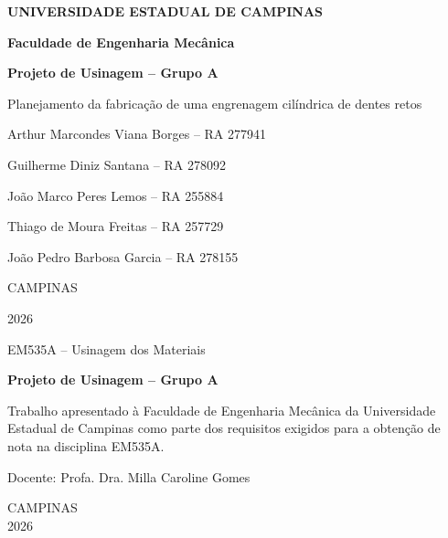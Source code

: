 \documentclass[12pt,a4paper,oneside]{report}
\newcommand{\grupo}{Grupo A}
\newcommand{\autorA}{Arthur Marcondes Viana Borges -- RA 277941}
\newcommand{\autorB}{Guilherme Diniz Santana -- RA 278092}
\newcommand{\autorC}{João Marco Peres Lemos -- RA 255884}
\newcommand{\autorD}{Thiago de Moura Freitas -- RA 257729}
\newcommand{\autorE}{João Pedro Barbosa Garcia -- RA 278155}
\begin{document}

\begin{titlepage}
\centering
{\large\bfseries UNIVERSIDADE ESTADUAL DE CAMPINAS\par}
\vspace{4pt}
{\bfseries Faculdade de Engenharia Mecânica\par}
\vfill
{\LARGE\bfseries Projeto de Usinagem -- \grupo\par}
\vspace{12pt}
Planejamento da fabricação de uma engrenagem cilíndrica de dentes retos\par
\vfill
\autorA\par \autorB\par \autorC\par \autorD\par \autorE\par
\vfill
CAMPINAS\par 2026\par
\end{titlepage}

\thispagestyle{empty}
\begin{center}
EM535A -- Usinagem dos Materiais\par
\vspace*{\fill}
{\Large\bfseries Projeto de Usinagem -- \grupo\par}
\vspace*{\fill}
\end{center}
\hfill\begin{minipage}{0.5\textwidth}
\singlespacing\small
Trabalho apresentado à Faculdade de Engenharia Mecânica da Universidade Estadual de Campinas como parte dos
requisitos exigidos para a obtenção de nota na disciplina EM535A.
\end{minipage}
\vspace*{\fill}

\noindent Docente: Profa. Dra. Milla Caroline Gomes
\vspace*{\fill}
\begin{center}CAMPINAS\\2026\end{center}
\newpage

\pagestyle{empty}
{\singlespacing
\listoffigures\thispagestyle{empty}\clearpage
\listofquadros\thispagestyle{empty}\clearpage
\listoftables\thispagestyle{empty}\clearpage
\tableofcontents\thispagestyle{empty}\clearpage}

\pagestyle{abnt}











{\singlespacing\setlength{\parskip}{8pt}
}
\end{document}

